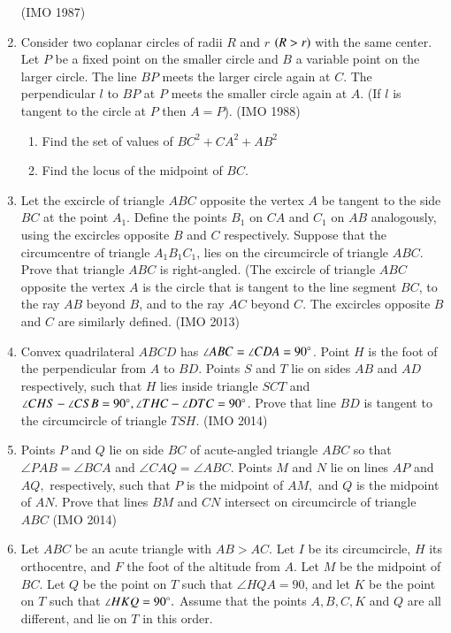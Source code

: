 \begin{enumerate}[label=\thesubsection.\arabic*,ref=\thesubsection.\theenumi]
	    \hfill(IMO  1987)
    \item Consider two coplanar circles of radii $R$ and $r$ $\left(R > r\right)$ with the same center. Let $P$ be a fixed point on the smaller circle and $B$ a variable point on the larger circle. The line $BP$ meets the larger circle again at $C$. The perpendicular $l$ to $BP $ at $P$ meets the smaller circle again at $A$. (If $l$ is tangent to the circle at $P$ then $A = P$).
\hfill(IMO  1988)
\begin{enumerate}
	\item  Find the set of values of $BC^2+CA^2+AB^2$ 
	\item  Find the locus of the midpoint of $BC$.
\end{enumerate}
\item  Let the excircle of triangle $ABC$ opposite the vertex $A$ be tangent to the side $BC$ at the point $A_1$. Define the points $B_1$ on $CA$ and $C_1$ on $AB$ analogously, using the excircles opposite $B$ and $C$ respectively. Suppose that the circumcentre of triangle $A_1B_1C_1$, lies on the circumcircle of triangle $ABC$. Prove that triangle $ABC$ is right-angled. 
	(The excircle of triangle $ABC$ opposite the vertex $A$ is the circle that is tangent to the line segment $BC$, to the ray $AB$ beyond $B$, and to the ray $AC$ beyond $C$. The excircles opposite $B$ and $C$ are similarly defined. \hfill(IMO  2013)
\item  Convex quadrilateral $ABCD$ has $\angle ABC= \angle CDA = 90 \degree$. Point $H$ is the foot of the perpendicular from $A$ to $BD$. Points $S$ and $T$ lie on sides $AB$ and $AD$ respectively, such that $H$ lies inside triangle $SCT$ and $\angle CHS- \angle CSB = 90 \degree, \angle THC- \angle DTC = 90\degree$.
	Prove that line $BD$ is tangent to the circumcircle of triangle $TSH$.
	\hfill(IMO  2014)
\item   Points $P$ and $Q$ lie on side $BC$ of acute-angled triangle $ABC$ so that $\angle PAB= \angle BCA$ and $\angle CAQ=\angle ABC.$ Points $M$ and $N$ lie on lines $AP$ and $AQ,$ respectively, such that $P$ is the midpoint of $AM,$ and $Q$ is the midpoint of $AN.$ Prove that lines $BM$ and $CN$ intersect on circumcircle of triangle $ABC$ \hfill(IMO  2014)
\item   Let $ABC$ be an acute triangle with $AB > AC$. Let $I$ be its circumcircle, $H$ its orthocentre, and $F$ the foot of the altitude from $A$. Let $M$ be the midpoint of $BC$. Let $Q$ be the point on $T$ such that $\angle HQA= 90$, and let $K$ be the point on $T$ such that $\angle HKQ=90\degree.$ Assume that the points $ A, B, C, K$ and $Q$ are all different, and lie on $T$ in this order.

\end{enumerate}
